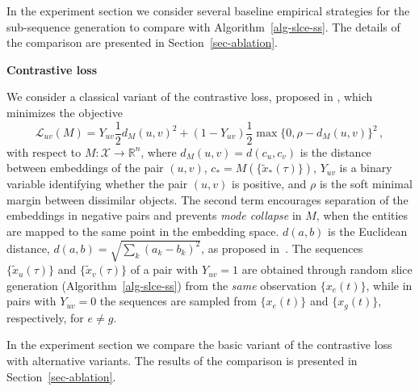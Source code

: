 \documentclass[sigconf]{acmart}
\newcommand{\revised}[1]{#1}
\begin{document}
\revised{
In the experiment section we consider several baseline empirical strategies for the sub-sequence
generation to compare with Algorithm~\ref{alg-slce-ss}. The details of the comparison are presented
in Section~\ref{sec-ablation}.
}


\textbf{Contrastive loss}
\revised{
We consider a classical variant of the contrastive loss, proposed in
\citep{Hadsell2006DimensionalityRB}, which minimizes the objective
\begin{equation*}
    \mathcal{L}_{u v}(M)
        = Y_{u v} \frac12 d_M(u, v)^2
        + (1 - Y_{u v}) \frac12\max\{0, \rho - d_M(u, v) \}^2
    \,,
\end{equation*}
with respect to $
    M \colon \mathcal{X} \to \mathbb{R}^n
$, where $
    d_M(u, v) = d(c_u, c_v)
$ is the distance between embeddings of the pair $(u, v)$, $
    c_* = M(\{\tilde{x}_*(\tau)\})
$, $Y_{u v}$ is a binary variable
identifying whether the pair $(u, v)$ is positive, and $\rho$ is the soft minimal margin between
dissimilar objects. The second term encourages separation of the embeddings in negative
pairs and prevents \emph{mode collapse} in $M$, when the entities are mapped to the same
point in the embedding space. $d(a, b)$ is the Euclidean distance, $
    d(a, b)
        = \sqrt{
            \sum_k (a_k - b_k)^2
        }
$, as proposed in~\citep{Hadsell2006DimensionalityRB}.
The sequences $\{\tilde{x}_u(\tau)\}$ and $\{\tilde{x}_v(\tau)\}$ of a pair with $Y_{u v} = 1$
are obtained through random slice generation (Algorithm~\ref{alg-slce-ss}) from the \emph{same}
observation $\{x_e(t)\}$, while in pairs with $Y_{u v} = 0$ the sequences are sampled from
$\{x_e(t)\}$ and $\{x_g(t)\}$, respectively, for $e \neq g$.

In the experiment section we compare the basic variant of the contrastive loss
with alternative variants. The results of the comparison is presented in Section~\ref{sec-ablation}.
}
\end{document}
